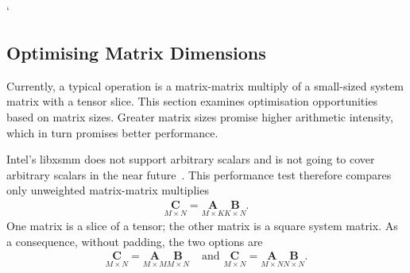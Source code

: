 \documentclass{acm_proc_article-sp}
\begin{document}


`
\subsection{Optimising Matrix Dimensions}\label{sec:libxsmmPerformanceStudy}
Currently, a typical operation is a matrix-matrix multiply of a small-sized system matrix with a tensor slice. This section examines optimisation opportunities based on matrix sizes. Greater matrix sizes promise higher arithmetic intensity, which in turn promises better performance.

Intel's libxsmm does not support arbitrary scalars and is not going to cover arbitrary scalars in the near future~\cite{libxsmmfeaturerequest}. This performance test therefore compares only unweighted matrix-matrix multiplies 
\begin{align*}
\underset{M\times N}{\textbf{C}} = \underset{M\times K}{\textbf{A}} \underset{K\times N}{\textbf{B}}.
\end{align*}
One matrix is a slice of a tensor; the other matrix is a square system matrix. As a consequence, without padding, the two options are
\begin{align*}
\underset{M\times N}{\textbf{C}} = \underset{M\times M}{\textbf{A}}  \underset{M\times N}{\textbf{B}} &\text{ and } \underset{M\times N}{\textbf{C}} = \underset{M\times N}{\textbf{A}}  \underset{N\times N}{\textbf{B}}.
\end{align*}
\end{document}
